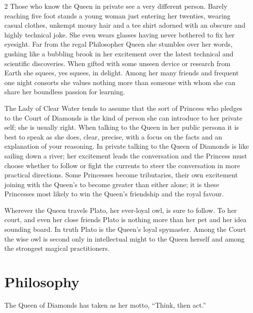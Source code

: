 \begin{multicols}{2}
Those who know the Queen in private see a very different person. Barely reaching five foot stands a young woman just entering her twenties, wearing casual clothes, unkempt mousy hair and a tee shirt adorned with an obscure and highly technical joke. She even wears glasses having never bothered to fix her eyesight. Far from the regal Philosopher Queen she stumbles over her words, gushing like a bubbling brook in her excitement over the latest technical and scientific discoveries. When gifted with some unseen device or research from Earth she squees, yes squees, in delight. Among her many friends and frequent one night consorts she values nothing more than someone with whom she can share her boundless passion for learning.

The Lady of Clear Water tends to assume that the sort of Princess who pledges to the Court of Diamonds is the kind of person she can introduce to her private self; she is usually right. When talking to the Queen in her public persona it is best to speak as she does, clear, precise, with a focus on the facts and an explanation of your reasoning. In private talking to the Queen of Diamonds is like sailing down a river; her excitement leads the conversation and the Princess must choose whether to follow or fight the currents to steer the conversation in more practical directions. Some Princesses become tributaries, their own excitement joining with the Queen's to become greater than either alone; it is these Princesses most likely to win the Queen's friendship and the royal favour.

Wherever the Queen travels Plato, her ever-loyal owl, is sure to follow. To her court, and even her close friends Plato is nothing more than her pet and her idea sounding board. In truth Plato is the Queen's loyal spymaster. Among the Court the wise owl is second only in intellectual might to the Queen herself and among the strongest magical practitioners.

\section*{Philosophy}

The Queen of Diamonds has taken as her motto, \textquotedblleft Think, then act.\textquotedblright


\end{multicols}
